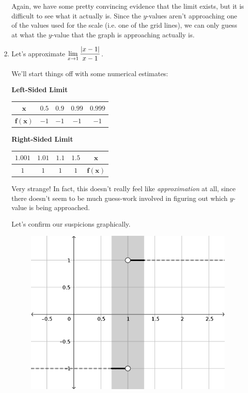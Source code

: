 \begin{enumerate}
  Again, we have some pretty convincing evidence that the limit exists, but it is difficult to see what it actually is.
  Since the $y$-values aren't approaching one of the values used for the scale (i.e. one of the grid lines), we can only guess at what the $y$-value that the graph is approaching actually is.

  \item Let's approximate $\displaystyle \lim_{x\to 1} \dfrac{|x-1|}{x-1}$.

  We'll start things off with some numerical estimates:

  \textbf{Left-Sided Limit}

  \begin{tabular}{ccccc} \toprule
    $\bm{x}$ & $0.5$ & $0.9$ & $0.99$ & $0.999$ \\ \midrule
    $\bm{f(x)}$ & $-1$ & $-1$ & $-1$ & $-1$\\ \bottomrule
  \end{tabular}

  \begin{flushright}
    \textbf{Right-Sided Limit}

    \begin{tabular}{ccccc} \toprule
      $1.001$ & $1.01$ & $1.1$ & $1.5$ & $\bm{x}$ \\ \midrule
      $1$ & $1$ & $1$ & $1$ & $\bm{f(x)}$ \\ \bottomrule
    \end{tabular}
  \end{flushright}

  Very strange!
  In fact, this doesn't really feel like \textit{approximation} at all, since there doesn't seem to be much guess-work involved in figuring out which $y$-value is being approached.

  Let's confirm our suspicions graphically.

  \begin{figure}[h!tb]
    \includegraphics[scale=0.75]{./1_limits/images/1-1_graph4.png}
    \centering
  \end{figure}


\end{enumerate}
